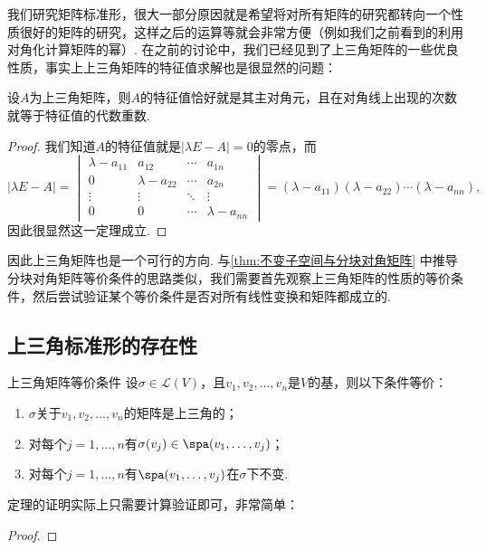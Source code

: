 我们研究矩阵标准形，很大一部分原因就是希望将对所有矩阵的研究都转向一个性质很好的矩阵的研究，这样之后的运算等就会非常方便（例如我们之前看到的利用对角化计算矩阵的幂）. 在之前的讨论中，我们已经见到了上三角矩阵的一些优良性质，事实上上三角矩阵的特征值求解也是很显然的问题：
\begin{theorem}{}{}
    设$A$为上三角矩阵，则$A$的特征值恰好就是其主对角元，且在对角线上出现的次数就等于特征值的代数重数.
\end{theorem}
\begin{proof}
    我们知道$A$的特征值就是$|\lambda E-A|=0$的零点，而
    \[|\lambda E-A|=\begin{vmatrix}
            \lambda-a_{11} & a_{12}         & \cdots & a_{1n}         \\
            0              & \lambda-a_{22} & \cdots & a_{2n}         \\
            \vdots         & \vdots         & \ddots & \vdots         \\
            0              & 0              & \cdots & \lambda-a_{nn}
        \end{vmatrix}=(\lambda-a_{11})(\lambda-a_{22})\cdots(\lambda-a_{nn}),\]
    因此很显然这一定理成立.
\end{proof}

因此上三角矩阵也是一个可行的方向. 与\autoref{thm:不变子空间与分块对角矩阵} 中推导分块对角矩阵等价条件的思路类似，我们需要首先观察上三角矩阵的性质的等价条件，然后尝试验证某个等价条件是否对所有线性变换和矩阵都成立的.

\subsection{上三角标准形的存在性}

\begin{theorem}{}{上三角矩阵等价条件}
    设$\sigma\in \mathcal{L}(V)$，且$v_1,v_2,\ldots,v_n$是$V$的基，则以下条件等价：
    \begin{enumerate}
        \item $\sigma$关于$v_1,v_2,\ldots,v_n$的矩阵是上三角的；

        \item 对每个$j=1,\ldots,n$有$\sigma(v_j)\in\spa(v_1,\ldots,v_j)$；

        \item 对每个$j=1,\ldots,n$有$\spa(v_1,\ldots,v_j)$在$\sigma$下不变.
    \end{enumerate}
\end{theorem}
定理的证明实际上只需要计算验证即可，非常简单：
\begin{proof}

\end{proof}

